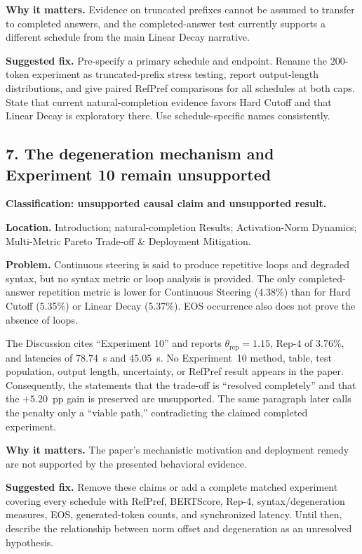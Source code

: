 \documentclass[11pt]{article}
\begin{document}
\textbf{Why it matters.} Evidence on truncated prefixes cannot be assumed to transfer to completed answers, and the completed-answer test currently supports a different schedule from the main Linear Decay narrative.

\textbf{Suggested fix.} Pre-specify a primary schedule and endpoint.  Rename the 200-token experiment as truncated-prefix stress testing, report output-length distributions, and give paired RefPref comparisons for all schedules at both caps.  State that current natural-completion evidence favors Hard Cutoff and that Linear Decay is exploratory there.  Use schedule-specific names consistently.

\subsection*{7. The degeneration mechanism and Experiment 10 remain unsupported}

\textbf{Classification: unsupported causal claim and unsupported result.}

\textbf{Location.} Introduction; natural-completion Results; Activation-Norm Dynamics; Multi-Metric Pareto Trade-off \& Deployment Mitigation.

\textbf{Problem.} Continuous steering is said to produce repetitive loops and degraded syntax, but no syntax metric or loop analysis is provided.  The only completed-answer repetition metric is lower for Continuous Steering (4.38\%) than for Hard Cutoff (5.35\%) or Linear Decay (5.37\%).  EOS occurrence also does not prove the absence of loops.

The Discussion cites ``Experiment 10'' and reports $\theta_{\text{rep}}=1.15$, Rep-4 of 3.76\%, and latencies of 78.74~s and 45.05~s.  No Experiment~10 method, table, test population, output length, uncertainty, or RefPref result appears in the paper.  Consequently, the statements that the trade-off is ``resolved completely'' and that the $+5.20$~pp gain is preserved are unsupported.  The same paragraph later calls the penalty only a ``viable path,'' contradicting the claimed completed experiment.

\textbf{Why it matters.} The paper's mechanistic motivation and deployment remedy are not supported by the presented behavioral evidence.

\textbf{Suggested fix.} Remove these claims or add a complete matched experiment covering every schedule with RefPref, BERTScore, Rep-4, syntax/degeneration measures, EOS, generated-token counts, and synchronized latency.  Until then, describe the relationship between norm offset and degeneration as an unresolved hypothesis.
\end{document}
